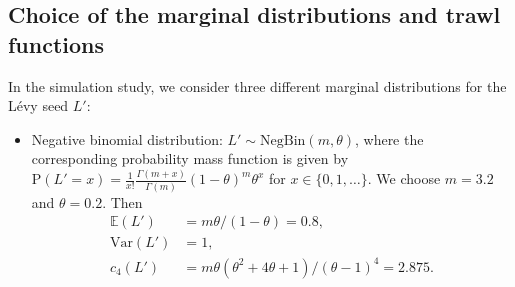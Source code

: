 \documentclass{article}
\theoremstyle{plain}
\theoremstyle{definition}
\theoremstyle{remark}
\newcommand{\Var}{\ensuremath{\mathrm{Var}}}
\begin{document}
\begin{appendix}
\subsection{Choice of the marginal distributions and trawl functions}
In the simulation study, we consider three different marginal distributions for the L\'{e}vy seed $L'$:
\begin{itemize}
	\item Negative binomial distribution: $L'\sim\mathrm{NegBin}(m, \theta)$, where the corresponding probability mass function is given by
	$\mathrm{P}(L'=x)=\frac{1}{x!}\frac{\Gamma \left( m
		+x\right) }{\Gamma \left( m \right) }\left( 1-\theta \right)^{m }\theta^{x}$ for $x \in \{0, 1, \ldots\}$. We choose $m=3.2$ and $\theta =0.2$. Then 
	\begin{align*}
		\mathbb{E}(L')&=m \theta/(1-\theta)=0.8,\\
		\Var(L')&=1, \\
		c_4(L')&=m \theta(\theta^2+4\theta+1)/(\theta-1)^4=2.875.
	\end{align*}
	

\end{itemize}
\end{appendix}
\end{document}
